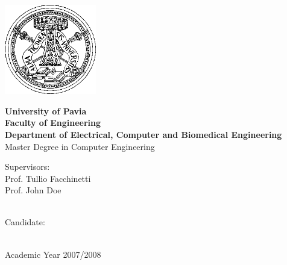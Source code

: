 \frenchspacing
\frontmatter


\begin{titlepage}

\thispagestyle{empty}
\begin{center}
	\vskip 1cm
	\includegraphics[width=4cm]{figs/Logo-unipv-bw}
	\vskip 0.5cm
	
	\LARGE
		\textbf{University of Pavia}\\
		\textbf{Faculty of Engineering}\\
		\textbf{Department of Electrical, Computer and Biomedical Engineering}
		\vskip 0.5cm
	\Large
		Master Degree in Computer Engineering
	
	\vskip 1.5cm
	\Huge
		\textbf{\printtitle}
	\vskip 1.5cm
	
	\Large
		\begin{minipage}[t]{7cm}
			Supervisors:\\
			Prof. Tullio Facchinetti\\
			Prof. John Doe\\
			\\


		\end{minipage}
		\hfill
		\begin{minipage}[t]{5cm}
			Candidate:\\
			\printauthor\\
		\end{minipage}
		
		\vskip 1.5cm
		Academic Year 2007/2008
\end{center}

\vfill
\eject
\end{titlepage}
